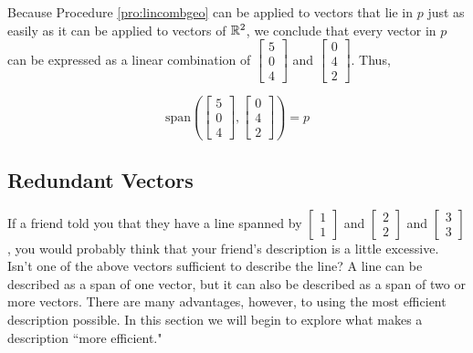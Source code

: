 \documentclass{ximera}
\begin{document}
\begin{example}
\begin{explanation}
Because Procedure \ref{pro:lincombgeo} can be applied to vectors that lie in $p$ just as easily as it can be applied to vectors of $\mathbb{R}^2$, we conclude that every vector in $p$ can be expressed as a linear combination of $\begin{bmatrix}5\\0\\4\end{bmatrix}$ and  $\begin{bmatrix}0\\4\\2\end{bmatrix}$.  Thus, 

$$\mbox{span}\left(\begin{bmatrix}5\\0\\4\end{bmatrix}, \begin{bmatrix}0\\4\\2\end{bmatrix}\right)=p$$

\end{explanation}
\end{example}

\subsection*{Redundant Vectors}

If a friend told you that they have a line spanned by $\begin{bmatrix}1\\1\end{bmatrix}$ and $\begin{bmatrix}2\\2\end{bmatrix}$ and $\begin{bmatrix}3\\3\end{bmatrix}$, you would probably think that your friend's description is a little excessive.  Isn't one of the above vectors sufficient to describe the line?  A line can be described as a span of one vector, but it can also be described as a span of two or more vectors.  There are many advantages, however, to using the most efficient description possible.  In this section we will begin to explore what makes a description ``more efficient."
\end{document}
